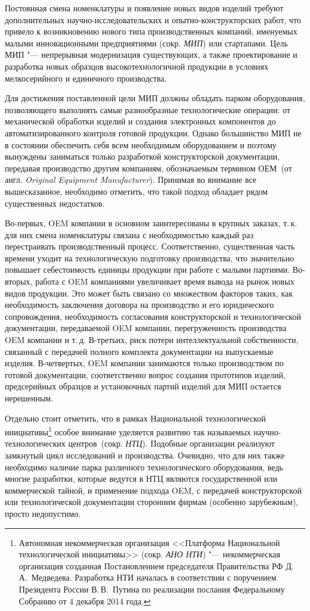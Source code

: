 Постоянная смена номенклатуры и появление новых видов изделий требуют дополнительных научно-исследовательских и опытно-конструкторских работ, что привело к возникновению нового типа производственных компаний, именуемых малыми инновационными предприятиями (сокр. \textit{МИП}) или стартапами. Цель МИП "--- непрерывная модернизация существующих, а также проектирование и разработка новых образцов высокотехнологичной продукции в условиях мелкосерийного и единичного производства.

Для достижения поставленной цели МИП должны обладать парком оборудования, позволяющего выполнять самые разнообразные технологические операции: от механической обработки изделий и создания электронных компонентов до автоматизированного контроля готовой продукции. Однако большинство МИП не в состоянии обеспечить себя всем необходимым оборудованием и поэтому вынуждены заниматься только разработкой конструкторской документации, передавая производство другим компаниям, обозначаемым термином ОЕМ~(от англ. \textit{Original Equipment Manufacturer}). Принимая во внимание все вышесказанное, необходимо отметить, что такой подход обладает рядом существенных недостатков.

Во-первых, OEM компании в основном заинтересованы в крупных заказах, т.\,к. для них смена номенклатуры связана с необходимостью каждый раз перестраивать производственный процесс. Соответственно, существенная часть времени уходит на технологическую подготовку производства, что значительно повышает себестоимость единицы продукции при работе с малыми партиями. Во-вторых, работа с OEM компаниями увеличивает время вывода на рынок новых видов продукции. Это может быть связано со множеством факторов таких, как необходимость заключения договора на производство и его юридического сопровождения, необходимость согласования конструкторской и технологической документации, передаваемой OEM компании, перегруженность производства OEM компании и т.\,д. В-третьих, риск потери интеллектуальной собственности, связанный с передачей полного комплекта документации на выпускаемые изделия. В-четвертых, OEM компании занимаются только производством по готовой документации, соответственно вопрос создания прототипов изделий, предсерийных образцов и установочных партий изделий для МИП остается нерешенным.

Отдельно стоит отметить, что в рамках Национальной технологической инициативы\footnote{Автономная некоммерческая организация <<Платформа Национальной технологической инициативы>> (сокр. \textit{АНО НТИ}) "--- некоммерческая организация созданная Постановлением председателя Правительства РФ Д.\,А.~Медведева. Разработка НТИ началась в соответствии с поручением Президента России В.\,В.~Путина по реализации послания Федеральному Собранию от 4 декабря 2014 года.} особое внимание уделяется развитию так называемых научно-технологических центров~(сокр. \textit{НТЦ}). Подобные организации реализуют замкнутый цикл исследований и производства. Очевидно, что для них также необходимо наличие парка различного технологического оборудования, ведь многие разработки, которые ведутся в НТЦ являются государственной или коммерческой тайной, и применение подхода OEM, с передачей конструкторской или технологической документации сторонним фирмам (особенно зарубежным), просто недопустимо.  

